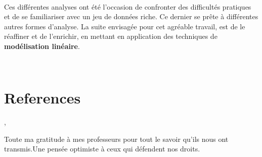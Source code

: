 \documentclass[]{imsart}
\numberwithin{equation}{section}
\theoremstyle{plain}
\begin{document}
~

Ces différentes analyses ont été l'occasion de confronter des difficultés pratiques et de se familiariser avec un jeu de données riche. Ce dernier se prête à différentes autres formes d'analyse. La suite envisagée pour cet agréable travail, est de le réaffiner et de l'enrichir, en mettant en application des techniques de \textbf{modélisation linéaire}.

~

\hypertarget{references}{%
\section*{References}\label{references}}

\citet{Analyse}, \citet*{Extraction}

\begin{supplement}
\sdescription{}
\end{supplement}

\begin{acks}[Acknowledgments]
Toute ma gratitude à mes professeurs pour tout le savoir qu'ils nous ont transmis.Une pensée optimiste à ceux qui défendent nos droits.
\end{acks}



\end{document}
